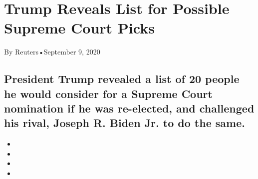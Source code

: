 \hypertarget{trump-reveals-list-for-possible-supreme-court-picks-1}{%
\section{Trump Reveals List for Possible Supreme Court
Picks}\label{trump-reveals-list-for-possible-supreme-court-picks-1}}

By Reuters•September 9, 2020

\hypertarget{president-trump-revealed-a-list-of-20-people-he-would-consider-for-a-supreme-court-nomination-if-he-was-re-elected-and-challenged-his-rival-joseph-r-biden-jr-to-do-the-same-1}{%
\subsection{President Trump revealed a list of 20 people he would
consider for a Supreme Court nomination if he was re-elected, and
challenged his rival, Joseph R. Biden Jr. to do the
same.}\label{president-trump-revealed-a-list-of-20-people-he-would-consider-for-a-supreme-court-nomination-if-he-was-re-elected-and-challenged-his-rival-joseph-r-biden-jr-to-do-the-same-1}}

\begin{itemize}
\item
\item
\item
\item
\end{itemize}

